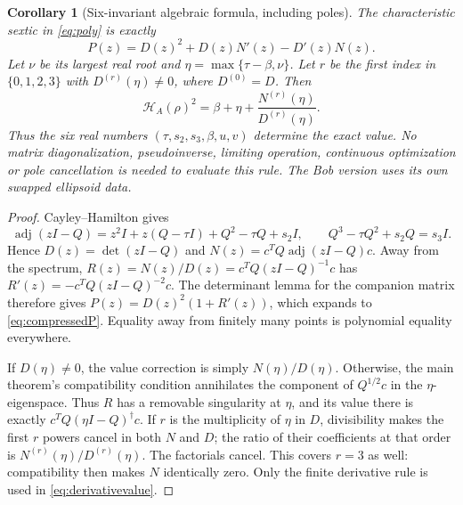 \documentclass[11pt]{article}
\newtheorem{corollary}[theorem]{Corollary}
\theoremstyle{remark}\newtheorem{remark}[theorem]{Remark}
\newcommand{\HF}{\mathcal H}
\begin{document}
\begin{corollary}[Six-invariant algebraic formula, including poles]
\label{cor:sixinvariants}
The characteristic sextic in \eqref{eq:poly} is exactly
\begin{equation}\label{eq:compressedP}\boxed{
 P(z)=D(z)^2+D(z)N'(z)-D'(z)N(z).}
\end{equation}
Let $\nu$ be its largest real root and $\eta=\max\{\tau-\beta,\nu\}$.
Let $r$ be the first index in $\{0,1,2,3\}$ with $D^{(r)}(\eta)\ne0$,
where $D^{(0)}=D$. Then
\begin{equation}\label{eq:derivativevalue}\boxed{
 \HF_A(\rho)^2=\beta+\eta+
             \frac{N^{(r)}(\eta)}{D^{(r)}(\eta)}.}
\end{equation}
Thus the six real numbers $(\tau,s_2,s_3,\beta,u,v)$ determine the exact
value. No matrix diagonalization, pseudoinverse, limiting operation,
continuous optimization or pole cancellation is needed to evaluate this rule.
The Bob version uses its own swapped ellipsoid data.
\end{corollary}
\begin{proof}
Cayley--Hamilton gives
\[
 \operatorname{adj}(zI-Q)
 =z^2I+z(Q-\tau I)+Q^2-\tau Q+s_2I,
 \qquad Q^3-\tau Q^2+s_2Q=s_3I.
\]
Hence $D(z)=\det(zI-Q)$ and
$N(z)=c^TQ\operatorname{adj}(zI-Q)c$.
Away from the spectrum, $R(z)=N(z)/D(z)=c^TQ(zI-Q)^{-1}c$ has
$R'(z)=-c^TQ(zI-Q)^{-2}c$. The determinant lemma for the companion
matrix therefore gives
$P(z)=D(z)^2(1+R'(z))$, which expands to
\eqref{eq:compressedP}. Equality away from finitely many points is
polynomial equality everywhere.

If $D(\eta)\ne0$, the value correction is simply $N(\eta)/D(\eta)$.
Otherwise, the main theorem's compatibility condition annihilates the
component of $Q^{1/2}c$ in the $\eta$-eigenspace. Thus $R$ has a removable
singularity at $\eta$, and its value there is exactly
$c^TQ(\eta I-Q)^\dagger c$. If $r$ is the multiplicity of $\eta$ in
$D$, divisibility makes the first $r$ powers cancel in both $N$ and $D$;
the ratio of their coefficients at that order is
$N^{(r)}(\eta)/D^{(r)}(\eta)$. The factorials cancel.
This covers $r=3$ as well: compatibility then makes $N$ identically zero.
Only the finite derivative rule is used in \eqref{eq:derivativevalue}.
\end{proof}
\end{document}
